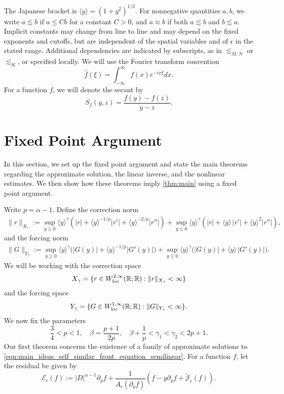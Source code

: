 \documentclass[11pt]{amsart}
\theoremstyle{definition}
\theoremstyle{remark}
\numberwithin{equation}{section}
\newcommand{\sq}[1]{\widetilde{#1}}
\newcommand{\R}{\mathbb{R}}
\newcommand{\mc}[1]{\mathcal{#1}}
\newcommand{\ang}[1]{\langle #1 \rangle}
\begin{document}
The Japanese bracket is $\ang{y}=(1+y^2)^{1/2}$. For nonnegative quantities $a,b$, we write
$a\lesssim b$ if $a\le Cb$ for a constant $C>0$, and $a\approx b$ if both $a\lesssim b$ and
$b\lesssim a$. Implicit constants may change from line to line and may depend on the fixed exponents
and cutoffs, but are independent of the spatial variables and of $\epsilon$ in the stated range.
Additional dependencies are indicated by subscripts, as in $\lesssim_{M,N}$ or $\lesssim_K$, or
specified locally.
We will use the Fourier transform convention
\[\hat{f}(\xi) = \int_{-\infty}^{\infty} f(x) e^{-i x \xi} dx.\]
For a function $f$, we will denote the secant by
\[S_f(y, z) = \frac{f(y) - f(z)}{y - z}.\]


\section{Fixed Point Argument}\label{sec:fixed_point}

In this section, we set up the fixed point argument and state the main theorems regarding the approximate solution, the linear inverse, and the nonlinear estimates. We then show how these theorems imply \cref{thm:main} using a fixed point argument. \par Write $p = \alpha - 1$. Define the correction norm 
\[
 \begin{split}
 \|r\|_{X_\gamma}:=\sup_{y\ge0}\ang{y}^\gamma(|r|+\ang{y}^{-1/p}|r'|+\ang{y}^{-2/p}|r''|) +\sup_{y\le0}\ang{y}^\gamma(|r|+\ang{y}\,|r'|+\ang{y}^2|r''|),
 \end{split}
\]
and the forcing norm
\begin{equation}\label{eq:Y}
\begin{aligned}
 \|G\|_{Y_\gamma}:= \sup_{y \geq 0}\ang{y}^\gamma\bigl(|G(y)|+\ang{y}^{-1/p}|G'(y)|\bigr) +\sup_{y\le0}\ang{y}^\gamma\bigl(|G(y)|+\ang{y}\,|G'(y)|\bigr).
 \end{aligned}
\end{equation}
We will be working with the correction space
\[X_\gamma = \{r \in W^{2,\infty}_{\textup{loc}}(\R;\R) : \|r\|_{X_\gamma} < \infty\}\]
and the forcing space
\[Y_\gamma = \{G \in  W^{1,\infty}_{\textup{loc}}(\R;\R) : \|G\|_{Y_\gamma} < \infty\}.\]
We now fix the parameters
\[\frac{3}{4} < p < 1, \quad \beta = \frac{p + 1}{2p}, \quad \beta + \frac{1}{p} < \gamma_1 < \gamma_2 < 2p + 1.\]
Our first theorem concerns the existence of a family of approximate solutions to \cref{eqn:main_ideas_self_similar_front_equation_semilinear}. For a function $f$, let the residual be given by 
\[\mc{E}_\epsilon(f) := |D|^{\alpha - 1}\partial_y f + \frac{1}{A_\epsilon(\partial_y f)}\left(f - y\partial_yf + \sq{\mc{J}}_\epsilon(f)\right).\]
\end{document}
